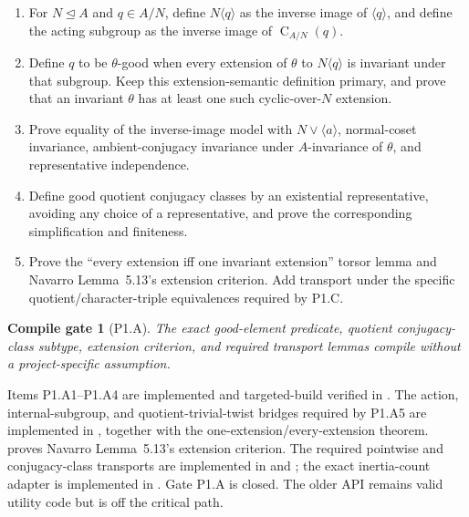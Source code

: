 \documentclass[11pt]{article}
\newtheorem{gate}{Compile gate}
\newcommand{\Cent}{\operatorname{C}}
\begin{document}
\begin{enumerate}[label=\textbf{P1.A\arabic*.},leftmargin=*]
  \item For \(N\trianglelefteq A\) and \(q\in A/N\), define
  \(N\langle q\rangle\) as the inverse image of \(\langle q\rangle\), and
  define the acting subgroup as the inverse image of
  \(\Cent_{A/N}(q)\).
  \item Define \(q\) to be \(\theta\)-good when every extension of
  \(\theta\) to \(N\langle q\rangle\) is invariant under that subgroup.
  Keep this extension-semantic definition primary, and prove that an
  invariant \(\theta\) has at least one such cyclic-over-\(N\) extension.
  \item Prove equality of the inverse-image model with
  \(N\vee\langle a\rangle\), normal-coset invariance, ambient-conjugacy
  invariance under \(A\)-invariance of \(\theta\), and representative
  independence.
  \item Define good quotient conjugacy classes by an existential
  representative, avoiding any choice of a representative, and prove the
  corresponding  simplification and finiteness.
  \item Prove the ``every extension iff one invariant extension'' torsor
  lemma and Navarro Lemma~5.13's extension criterion.  Add transport
  under the specific quotient/character-triple equivalences required by
  P1.C.
\end{enumerate}

\begin{gate}[P1.A]
The exact good-element predicate, quotient conjugacy-class subtype,
extension criterion, and required transport lemmas compile without a
project-specific assumption.
\end{gate}

Items P1.A1--P1.A4 are implemented and targeted-build verified in
.  The action, internal-subgroup, and
quotient-trivial-twist bridges required by P1.A5 are implemented in
, together with the
one-extension/every-extension theorem.
 proves Navarro Lemma~5.13's
extension criterion.  The required pointwise and conjugacy-class
transports are implemented in  and
; the exact inertia-count adapter is
implemented in .  Gate P1.A is closed.
The older
 API remains valid utility code but is off
the critical path.
\end{document}
